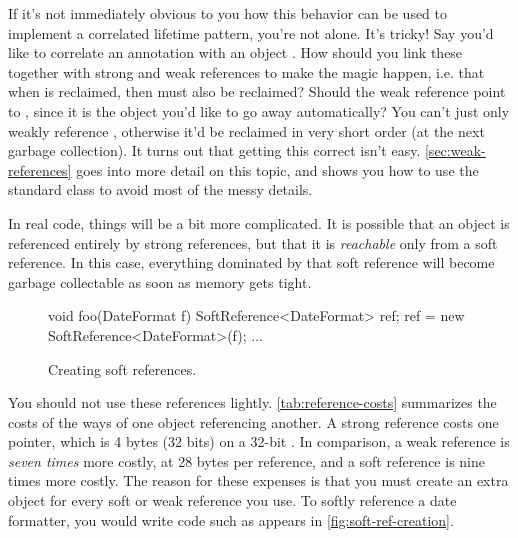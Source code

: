 If it's not immediately obvious to you how this behavior can be used to
implement a correlated lifetime pattern, you're not alone. It's tricky! Say
you'd like to correlate an annotation  with an object . How
should you link these together with strong and weak references to make the magic
happen, i.e. that when  is reclaimed, then  must also be
reclaimed? Should the weak reference point to , since it is the object
you'd like to go away automatically? You can't just only weakly reference
, otherwise it'd be reclaimed in very short order (at the next garbage
collection). It turns out that getting this correct isn't easy.
\autoref{sec:weak-references} goes into more detail on this topic, and shows you
how to use the standard  class to avoid most of the messy
details.

In real code, things will be a bit more complicated. It is possible that an
object is referenced entirely by strong references, but that it is
\emph{reachable} only from a soft reference. In this case, everything dominated
by that soft reference will become garbage collectable as soon as memory gets
tight.


 


\begin{figure}
\centering
\begin{framedlisting}
void foo(DateFormat f) {
   SoftReference<DateFormat> ref;
   ref = new SoftReference<DateFormat>(f);
   ...
}
\end{framedlisting}
\caption{Creating soft references.}
\label{fig:soft-ref-creation}
\end{figure}
You should not use these references lightly. \autoref{tab:reference-costs}
summarizes the costs of the ways of one object referencing another. A strong
reference costs one pointer, which is 4 bytes (32 bits) on a 32-bit \jre. In
comparison, a weak reference is \emph{seven times} more costly, at 28 bytes per
reference, and a soft reference is nine times more costly. The reason for these
expenses is that you must create an extra  object for
every soft or weak reference you use. To softly reference a date formatter,
you would write code such as appears in \autoref{fig:soft-ref-creation}.

